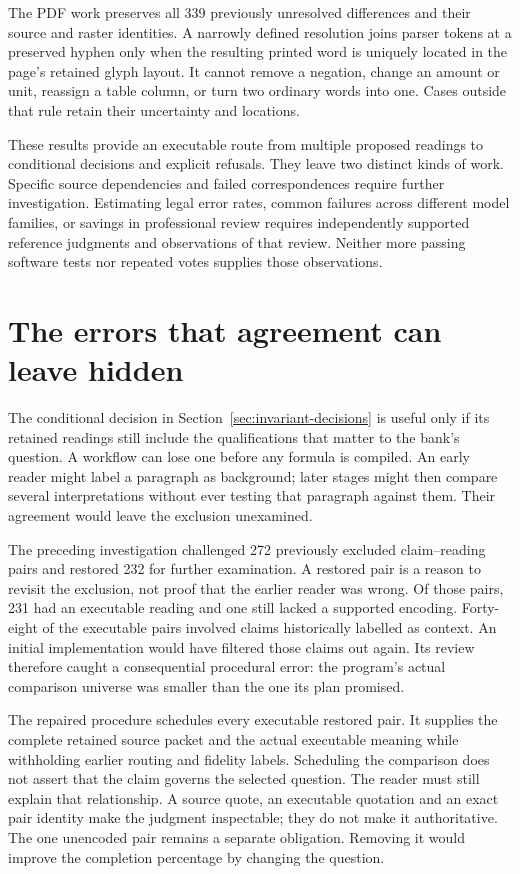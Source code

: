 \documentclass[12pt,a4paper,oneside,openany]{book}
\begin{document}
The PDF work preserves all 339 previously unresolved differences and their
source and raster identities. A narrowly defined resolution joins parser
tokens at a preserved hyphen only when the resulting printed word is uniquely
located in the page's retained glyph layout. It cannot remove a negation,
change an amount or unit, reassign a table column, or turn two ordinary words
into one. Cases outside that rule retain their uncertainty and locations.

These results provide an executable route from multiple proposed readings to
conditional decisions and explicit refusals. They leave two distinct kinds of
work. Specific source dependencies and failed correspondences require further
investigation. Estimating legal error rates, common failures across different
model families, or savings in professional review requires independently
supported reference judgments and observations of that review. Neither more
passing software tests nor repeated votes supplies those observations.


\section{The errors that agreement can leave hidden}
\label{sec:executed-assurance}

The conditional decision in Section~\ref{sec:invariant-decisions} is useful only
if its retained readings still include the qualifications that matter to the
bank's question. A workflow can lose one before any formula is compiled. An
early reader might label a paragraph as background; later stages might then
compare several interpretations without ever testing that paragraph against
them. Their agreement would leave the exclusion unexamined.

The preceding investigation challenged 272 previously excluded claim--reading
pairs and restored 232 for further examination. A restored pair is a reason to
revisit the exclusion, not proof that the earlier reader was wrong. Of those
pairs, 231 had an executable reading and one still lacked a supported encoding.
Forty-eight of the executable pairs involved claims historically labelled as
context. An initial implementation would have filtered those claims out again.
Its review therefore caught a consequential procedural error: the program's
actual comparison universe was smaller than the one its plan promised.

The repaired procedure schedules every executable restored pair. It supplies
the complete retained source packet and the actual executable meaning while
withholding earlier routing and fidelity labels. Scheduling the comparison does
not assert that the claim governs the selected question. The reader must still
explain that relationship. A source quote, an executable quotation and an exact
pair identity make the judgment inspectable; they do not make it authoritative.
The one unencoded pair remains a separate obligation. Removing it would improve
the completion percentage by changing the question.
\end{document}

